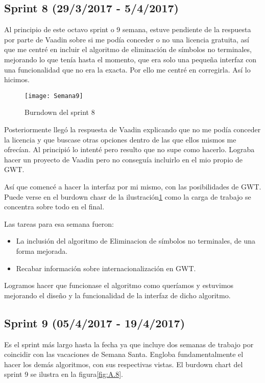 \subsection{Sprint 8 (29/3/2017 - 5/4/2017)}

Al principio de este octavo sprint o 9 semana, estuve pendiente de la respuesta por parte de Vaadin sobre si me podía conceder o no una licencia gratuita, así que me centré en incluir el algoritmo de eliminación de símbolos no terminales, mejorando lo que tenía hasta el momento, que era solo una pequeña interfaz con una funcionalidad que no era la exacta. Por ello me centré en corregirla. Así lo hicimos.

\begin{figure}[h]
\centering
\texttt{[image: Semana9]}
\caption{Burndown del sprint 8}
\label{fig:A.7}
\end{figure}

Posteriormente llegó la respuesta de Vaadin explicando que no me podía conceder la licencia y que buscase otras opciones dentro de las que ellos mismos me ofrecían. Al principió lo intenté pero resulto que no supe como hacerlo. Lograba hacer un proyecto de Vaadin pero no conseguía incluirlo en el mio propio de GWT.

Así que comencé a hacer la interfaz por mi mismo, con las posibilidades de GWT. Puede verse en el burdown chasr de la ilustración\ref{fig:A.7} como la carga de trabajo se concentra sobre todo en el final.

Las tareas para esa semana fueron: 

\begin{itemize}
\item La inclusión del algoritmo de Eliminacion de símbolos no terminales, de una forma mejorada.
\item Recabar información sobre internacionalización en GWT.
\end{itemize}

Logramos hacer que funcionase el algoritmo como queríamos y estuvimos mejorando el diseño y la funcionalidad de la interfaz de dicho algoritmo.

\subsection{Sprint 9 (05/4/2017 - 19/4/2017)}

Es el sprint más largo hasta la fecha ya que incluye dos semanas de trabajo por coincidir con las vacaciones de Semana Santa. Engloba fundamentalmente el hacer los demás algoritmos, con sus respectivas vistas. El burdown chart del sprint 9 se ilustra en la figura\ref{fig:A.8}.

